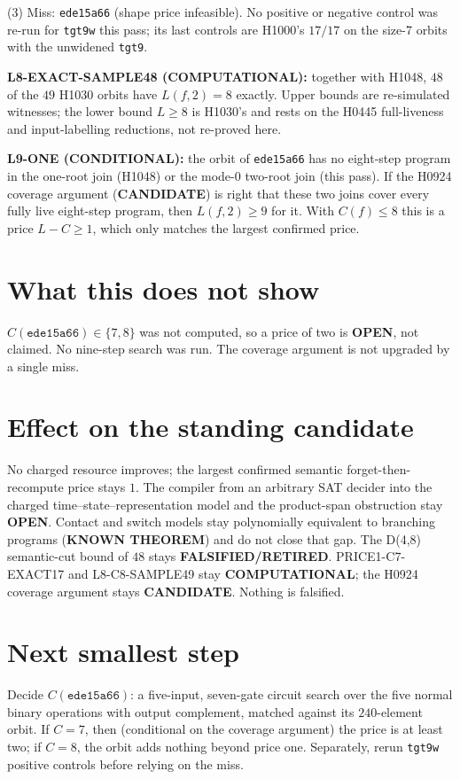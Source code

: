 \documentclass[11pt]{article}
\begin{document}
(3) Miss: \texttt{ede15a66} (shape price infeasible). No positive or negative control was re-run for \texttt{tgt9w} this pass; its last controls are H1000's $17/17$ on the size-7 orbits with the unwidened \texttt{tgt9}.

\textbf{L8-EXACT-SAMPLE48 (COMPUTATIONAL):} together with H1048, $48$ of the $49$ H1030 orbits have $L(f,2)=8$ exactly. Upper bounds are re-simulated witnesses; the lower bound $L\ge8$ is H1030's and rests on the H0445 full-liveness and input-labelling reductions, not re-proved here.

\textbf{L9-ONE (CONDITIONAL):} the orbit of \texttt{ede15a66} has no eight-step program in the one-root join (H1048) or the mode-0 two-root join (this pass). If the H0924 coverage argument (\textbf{CANDIDATE}) is right that these two joins cover every fully live eight-step program, then $L(f,2)\ge9$ for it. With $C(f)\le8$ this is a price $L-C\ge1$, which only matches the largest confirmed price.

\section*{What this does not show}
$C(\texttt{ede15a66})\in\{7,8\}$ was not computed, so a price of two is \textbf{OPEN}, not claimed. No nine-step search was run. The coverage argument is not upgraded by a single miss.

\section*{Effect on the standing candidate}
No charged resource improves; the largest confirmed semantic forget-then-recompute price stays $1$. The compiler from an arbitrary SAT decider into the charged time--state--representation model and the product-span obstruction stay \textbf{OPEN}. Contact and switch models stay polynomially equivalent to branching programs (\textbf{KNOWN THEOREM}) and do not close that gap. The D(4,8) semantic-cut bound of $48$ stays \textbf{FALSIFIED/RETIRED}. PRICE1-C7-EXACT17 and L8-C8-SAMPLE49 stay \textbf{COMPUTATIONAL}; the H0924 coverage argument stays \textbf{CANDIDATE}. Nothing is falsified.

\section*{Next smallest step}
Decide $C(\texttt{ede15a66})$: a five-input, seven-gate circuit search over the five normal binary operations with output complement, matched against its $240$-element orbit. If $C=7$, then (conditional on the coverage argument) the price is at least two; if $C=8$, the orbit adds nothing beyond price one. Separately, rerun \texttt{tgt9w} positive controls before relying on the miss.
\end{document}
